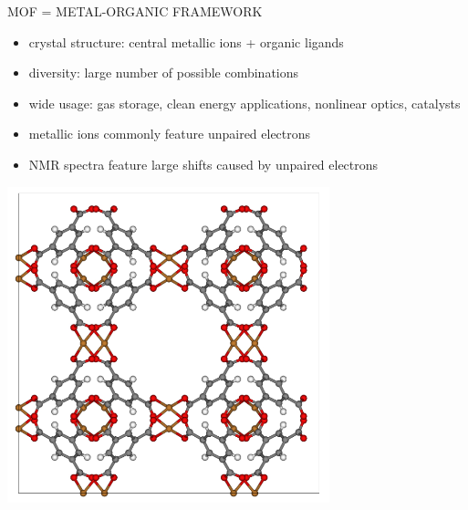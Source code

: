 \documentclass[slovene, usenames,dvipsnames]{beamer}
\begin{document}
\begin{frame}{MOF = METAL-ORGANIC FRAMEWORK }
  \begin{minipage}[]{0.5\textwidth}
    \begin{itemize}[]
       \item crystal structure: central metallic ions + organic ligands 
       \item diversity: large number of possible combinations  
       \item wide usage: gas storage, clean energy applications,
      nonlinear optics, catalysts
       \item metallic ions commonly feature unpaired electrons
       \item NMR spectra feature large shifts caused by unpaired electrons
    \end{itemize}
  \end{minipage}%
  \begin{minipage}[]{0.5\textwidth}
    \begin{minipage}[]{\textwidth}
      \centering
      \vspace{-0.5cm}
      \includegraphics[width=0.7\textwidth]{hkust.png}
    \end{minipage}
    
    \begin{minipage}[]{\textwidth}
      \centering
\end{minipage}
\end{minipage}
\end{frame}
\end{document}
